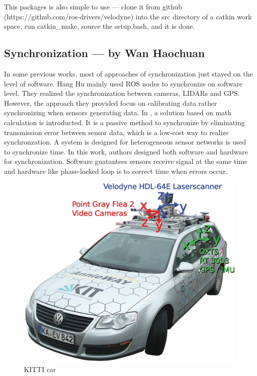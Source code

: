 \documentclass[conference]{IEEEtran}
\begin{document}
	This packages is also simple to use --- clone it from github (https://github.com/ros-drivers/velodyne) into the src directory of a catkin work space, run catkin\_make, source the setup.bash, and it is done. 
	
	\subsection{Synchronization --- by Wan Haochuan}
	In some previous works, most of approaches of synchronization just stayed on the level of software. Hang Hu \cite{1} mainly used ROS nodes to synchronize on software level. They realized the synchronization between cameras, LIDARs and GPS. However, the approach they provided focus on calibrating data rather synchronizing when sensors generating data.
	In \cite{Olson2010A}, a solution based on math calculation is introducted. It is a passive method to synchronize by eliminating transmission error between sensor data, which is a low-cost way to realize synchronzation.
	A system \cite{Amundson2006Time} is designed for heterogeneous sensor networks is used to synchronize time. In this work, authors designed both software and hardware for synchronization. Software guatantees sensors receive signal at the same time and hardware like phase-locked loop is to correct time when errors occur.
	\par
	\begin{figure}
		\centering
		\includegraphics[width=.4\textwidth]{kitti_car.png}
		\caption{KITTI car}
		\label{car}
	\end{figure}
\end{document}

